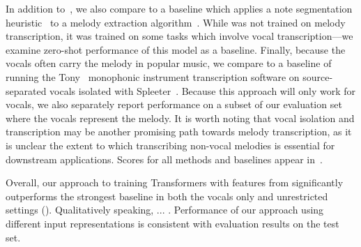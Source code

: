In addition to~\cite{ryynanen2008accompaniment}, we also compare to a baseline which applies a note segmentation heuristic~\cite{salamon2015midi} to a melody extraction algorithm~\cite{salamon2014melody}. 
While \mtthree{} was not trained on melody transcription, it was trained on some tasks which involve vocal transcription---we examine zero-shot performance of this model as a baseline. 
Finally, because the vocals often carry the melody in popular music, we compare to a baseline of running the Tony~\cite{mauch2015computer} monophonic instrument transcription software on source-separated vocals isolated with Spleeter~\cite{hennequin2020spleeter}. 
Because this approach will only work for vocals, we also separately report performance on a subset of our evaluation set where the vocals represent the melody. 
It is worth noting that vocal isolation and transcription may be another promising path towards melody transcription, 
as it is unclear the extent to which transcribing non-vocal melodies is essential for downstream applications.
Scores for all methods and baselines appear in~. 

Overall, our approach to training Transformers with features from \jukebox{} significantly outperforms the strongest baseline in both the vocals only and unrestricted settings (). 
Qualitatively speaking, ... \todo{}.
Performance of our approach using different input representations is consistent with evaluation results on the \hooktheory{} test set. 